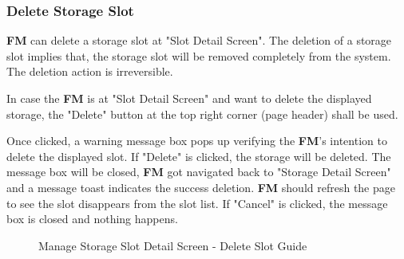 \subsubsection{Delete Storage Slot}

\textbf{FM} can delete a storage slot at "Slot Detail Screen". 
The deletion of a storage slot implies that, the storage slot will be removed completely from the system. The deletion action is irreversible. 

In case the \textbf{FM} is at "Slot Detail Screen" and want to delete the displayed storage, the "Delete" button at the top right corner (page header) shall be used. 

Once clicked, a warning message box pops up verifying the \textbf{FM}'s intention to delete the displayed slot. If "Delete" is clicked, the storage will be deleted. The message box will be closed, \textbf{FM} got navigated back to "Storage Detail Screen" and a message toast indicates the success deletion. \textbf{FM} should refresh the page to see the slot disappears from the slot list. If "Cancel" is clicked, the message box is closed and nothing happens.

\begin{figure}[H]
	\centering

    \vspace{10pt}
    
    \caption{Manage Storage Slot Detail Screen - Delete Slot Guide}
	\label{fig:MSslotObjDeleteGuide}
\end{figure}


